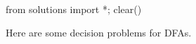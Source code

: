 \begin{python0}
from solutions import *; clear()
\end{python0}

Here are some decision problems for DFAs.


